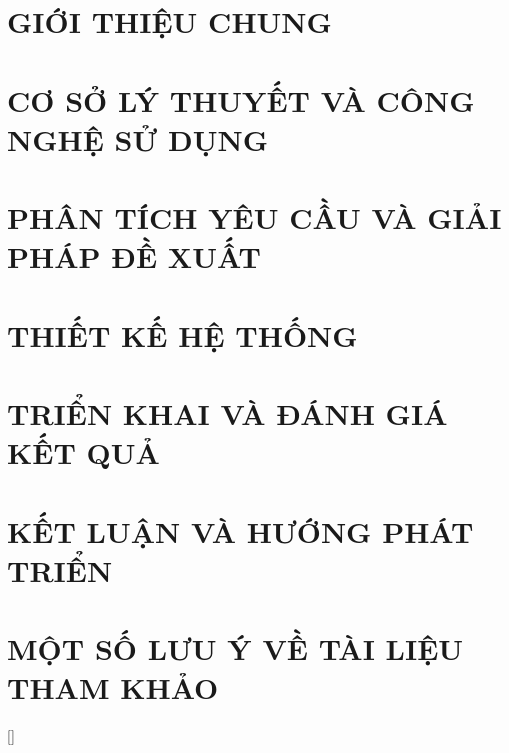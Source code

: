 \documentclass[a4paper,12pt,twoside]{report} %
\renewcommand{\bibname}{Danh_sach_tai_lieu_tham_khao}
\theoremstyle{definition}
\begin{document}
\newpage
{}

\pagestyle{fancy}
\fancyhf{}
\fancyhead[RE, LO]{\leftmark}
\fancyfoot[RE, LO]{\thepage}

\chapter{GIỚI THIỆU CHUNG}


\newpage
\chapter{CƠ SỞ LÝ THUYẾT VÀ CÔNG NGHỆ SỬ DỤNG}


\newpage
\chapter{PHÂN TÍCH YÊU CẦU VÀ GIẢI PHÁP ĐỀ XUẤT}


\newpage
\chapter{THIẾT KẾ HỆ THỐNG}


\newpage
\chapter{TRIỂN KHAI VÀ ĐÁNH GIÁ KẾT QUẢ}


\newpage
\chapter{KẾT LUẬN VÀ HƯỚNG PHÁT TRIỂN}


\newpage
\chapter*{MỘT SỐ LƯU Ý VỀ TÀI LIỆU THAM KHẢO}
\label{chapter:reference}


\newpage
\renewcommand\bibname{TÀI LIỆU THAM KHẢO}
\printbibliography
{}

\appendixpage
\appendix
\addappheadtotoc

[]
\titlespacing*{\chapter}{0pt}{-20pt}{20pt}
\end{document}
